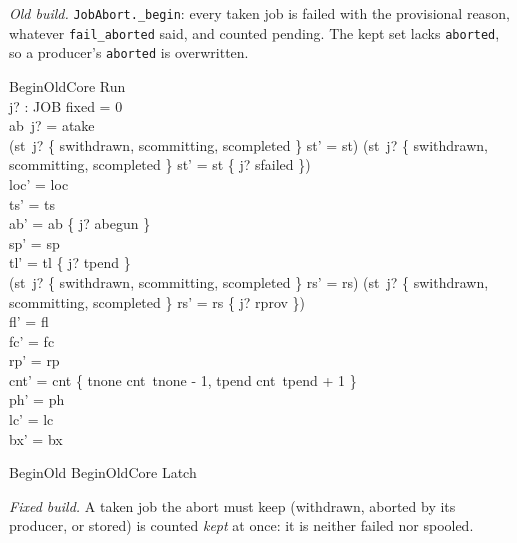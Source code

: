 \documentclass[a4paper,10pt,fleqn]{article}
\newcommand{\field}[1]{\texttt{#1}}
\begin{document}
\emph{Old build.} \field{JobAbort._begin}: every taken job is failed with the
provisional reason, whatever \field{fail\_aborted} said, and counted pending. The
kept set lacks \field{aborted}, so a producer's \field{aborted} is overwritten.

\begin{schema}{BeginOldCore}
\Delta Run \\ j? : JOB
\where
fixed = 0 \\
ab~j? = atake \\
(st~j? \in \{ swithdrawn, scommitting, scompleted \} \implies st' = st) \land (st~j? \notin \{ swithdrawn, scommitting, scompleted \} \implies st' = st \oplus \{ j? \mapsto sfailed \}) \\
loc' = loc \\
ts' = ts \\
ab' = ab \oplus \{ j? \mapsto abegun \} \\
sp' = sp \\
tl' = tl \oplus \{ j? \mapsto tpend \} \\
(st~j? \in \{ swithdrawn, scommitting, scompleted \} \implies rs' = rs) \land (st~j? \notin \{ swithdrawn, scommitting, scompleted \} \implies rs' = rs \oplus \{ j? \mapsto rprov \}) \\
fl' = fl \\
fc' = fc \\
rp' = rp \\
cnt' = cnt \oplus \{ tnone \mapsto cnt~tnone - 1, tpend \mapsto cnt~tpend + 1 \} \\
ph' = ph \\
lc' = lc \\
bx' = bx
\end{schema}

\begin{zed}
BeginOld  BeginOldCore \land Latch
\end{zed}

\emph{Fixed build.} A taken job the abort must keep (withdrawn, aborted by its
producer, or stored) is counted \emph{kept} at once: it is neither failed nor
spooled.
\end{document}
